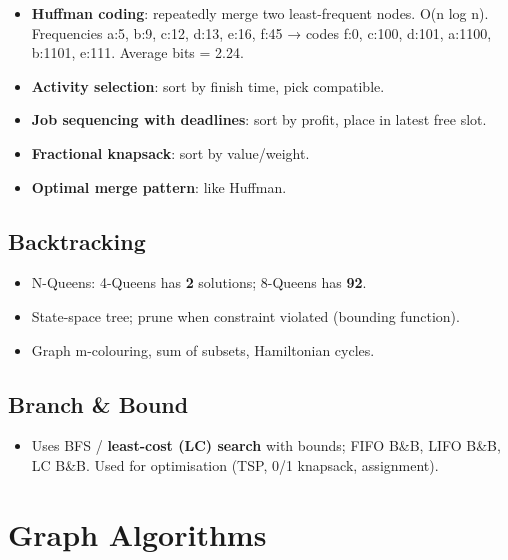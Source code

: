 \begin{itemize}
\tightlist
\item
  \textbf{Huffman coding}: repeatedly merge two least-frequent nodes. O(n log n).
  Frequencies a:5, b:9, c:12, d:13, e:16, f:45 → codes f:0, c:100, d:101, a:1100, b:1101, e:111. Average bits = 2.24.
\item
  \textbf{Activity selection}: sort by finish time, pick compatible.
\item
  \textbf{Job sequencing with deadlines}: sort by profit, place in latest free slot.
\item
  \textbf{Fractional knapsack}: sort by value/weight.
\item
  \textbf{Optimal merge pattern}: like Huffman.
\end{itemize}

\needspace{95pt}

\hypertarget{p2-07--73-backtracking}{%
\subsection{Backtracking}\label{p2-07--73-backtracking}}

\begin{itemize}
\tightlist
\item
  N-Queens: 4-Queens has \textbf{2} solutions; 8-Queens has \textbf{92}.
\item
  State-space tree; prune when constraint violated (bounding function).
\item
  Graph m-colouring, sum of subsets, Hamiltonian cycles.
\end{itemize}

\needspace{95pt}

\hypertarget{p2-07--74-branch--bound}{%
\subsection{Branch \& Bound}\label{p2-07--74-branch--bound}}

\begin{itemize}
\tightlist
\item
  Uses BFS / \textbf{least-cost (LC) search} with bounds; FIFO B\&B, LIFO B\&B, LC B\&B. Used for optimisation (TSP, 0/1 knapsack, assignment).
\end{itemize}

\needspace{227pt}

\hypertarget{p2-07--8-graph-algorithms}{%
\section{Graph Algorithms}\label{p2-07--8-graph-algorithms}}

